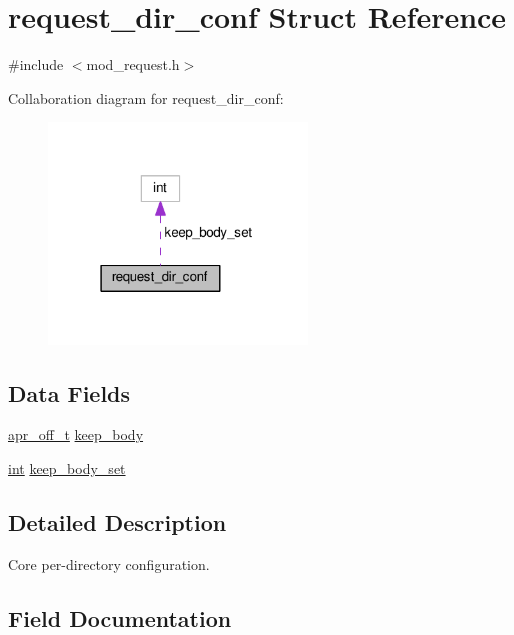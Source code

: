 \hypertarget{structrequest__dir__conf}{}\section{request\+\_\+dir\+\_\+conf Struct Reference}
\label{structrequest__dir__conf}


{\ttfamily \#include $<$mod\+\_\+request.\+h$>$}



Collaboration diagram for request\+\_\+dir\+\_\+conf\+:
\nopagebreak
\begin{figure}[H]
\begin{center}
\leavevmode
\includegraphics[width=195pt]{structrequest__dir__conf__coll__graph}
\end{center}
\end{figure}
\subsection*{Data Fields}
\begin{DoxyCompactItemize}
\item 
\hyperlink{group__apr__platform_ga6938af9075cec15c88299109381aa984}{apr\+\_\+off\+\_\+t} \hyperlink{structrequest__dir__conf_a5176f45488e5d5a4cc65587f8ebe1367}{keep\+\_\+body}
\item 
\hyperlink{pcre_8txt_a42dfa4ff673c82d8efe7144098fbc198}{int} \hyperlink{structrequest__dir__conf_ac22430cc266c0830362dec8a40b3aaee}{keep\+\_\+body\+\_\+set}
\end{DoxyCompactItemize}


\subsection{Detailed Description}
Core per-\/directory configuration. 

\subsection{Field Documentation}
